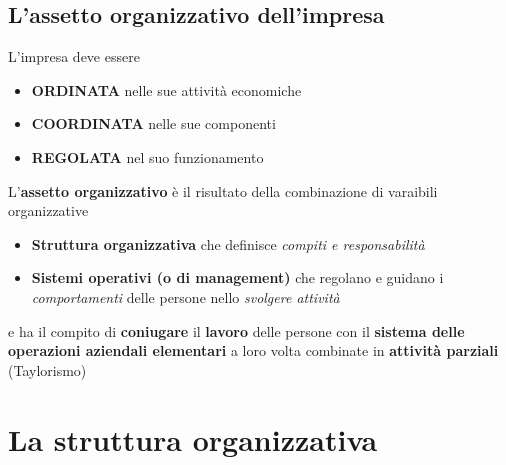\documentclass[12pt]{article}
\begin{document}
\subsection{L'assetto organizzativo dell'impresa}
L'impresa deve essere
\begin{itemize}
    \item \textbf{ORDINATA} nelle sue attività economiche
    \item \textbf{COORDINATA} nelle sue componenti
    \item \textbf{REGOLATA} nel suo funzionamento
\end{itemize}
L'\textbf{assetto organizzativo} è il risultato della combinazione di varaibili organizzative
\begin{itemize}
    \item \textbf{Struttura organizzativa} che definisce \textit{compiti e responsabilità}
    \item \textbf{Sistemi operativi (o di management)} che regolano e guidano i \textit{comportamenti} delle persone nello \textit{svolgere attività}
\end{itemize}
e ha il compito di \textbf{coniugare} il \textbf{lavoro} delle persone con il \textbf{sistema delle operazioni aziendali elementari} a loro volta combinate in \textbf{attività parziali} (Taylorismo)
\newpage
\section{La struttura organizzativa}
\end{document}
